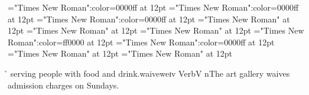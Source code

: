\font\examplesensearticlesectionletter="Times New Roman":color=0000ff at 12pt
\font\exampleusefirstoftypelastoftypesensearticlesectionletter="Times New Roman":color=0000ff at 12pt
\font\firstoftypegrammarcategorylastoftypesensearticlesectionletter="Times New Roman":color=0000ff at 12pt
\font\firstoftypelastoftypestressfirstoftypelastoftypepronunciationarticlesectionletter="Times New Roman" at 12pt
\font\firstoftypelastoftypepronunciationarticlesectionletter="Times New Roman" at 12pt
\font\firstoftypeheadwordlastoftypesectionletter="Times New Roman" at 12pt
\font\sensebeforearticlesectionletter="Times New Roman":color=ff0000 at 12pt
\font\sensearticlesectionletter="Times New Roman":color=0000ff at 12pt
\font\articlesectionletter="Times New Roman" at 12pt
\font\sectionletter="Times New Roman" at 12pt
 \r\n
{}\sensearticlesectionletter serving people with food and drink.\firstoftypeheadwordlastoftypesectionletter waive\firstoftypelastoftypepronunciationarticlesectionletter w\firstoftypelastoftypestressfirstoftypelastoftypepronunciationarticlesectionletter eɪ\firstoftypelastoftypepronunciationarticlesectionletter v \firstoftypegrammarcategorylastoftypesensearticlesectionletter Verb\exampleusefirstoftypelastoftypesensearticlesectionletter V n\examplesensearticlesectionletter The art gallery waives admission charges on Sundays.

\bye
